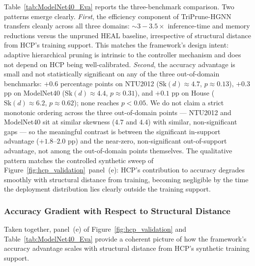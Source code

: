 \documentclass[10pt]{article}
\theoremstyle{plain}
\theoremstyle{definition}
\begin{document}
Table~\ref{tab:ModelNet40_Eva} reports the three-benchmark comparison. Two patterns emerge clearly. \emph{First}, the efficiency component of TriPrune-HGNN transfers cleanly across all three domains: $\sim\!3\!-\!3.5\!\times$ inference-time and memory reductions versus the unpruned HEAL baseline, irrespective of structural distance from HCP's training support. This matches the framework's design intent: adaptive hierarchical pruning is intrinsic to the controller mechanism and does not depend on HCP being well-calibrated. \emph{Second}, the accuracy advantage is small and not statistically significant on any of the three out-of-domain benchmarks: $+0.6$ percentage points on NTU2012 ($\mathrm{Sk}(d)\!\approx\!4.7$, $p\!\approx\!0.13$), $+0.3$ pp on ModelNet40 ($\mathrm{Sk}(d)\!\approx\!4.4$, $p\!\approx\!0.31$), and $+0.1$ pp on House ($\mathrm{Sk}(d)\!\approx\!6.2$, $p\!\approx\!0.62$); none reaches $p\!<\!0.05$. We do not claim a strict monotonic ordering across the three out-of-domain points --- NTU2012 and ModelNet40 sit at similar skewness ($4.7$ and $4.4$) with similar, non-significant gaps --- so the meaningful contrast is between the significant in-support advantage ($+1.8$--$2.0$ pp) and the near-zero, non-significant out-of-support advantage, not among the out-of-domain points themselves. The qualitative pattern matches the controlled synthetic sweep of Figure~\ref{fig:hcp_validation}~panel~(e): HCP's contribution to accuracy degrades smoothly with structural distance from training, becoming negligible by the time the deployment distribution lies clearly outside the training support.

\subsubsection{Accuracy Gradient with Respect to Structural Distance}
\label{sec:Eva_gradient}

Taken together, panel~(e) of Figure~\ref{fig:hcp_validation} and Table~\ref{tab:ModelNet40_Eva} provide a coherent picture of how the framework's accuracy advantage scales with structural distance from HCP's synthetic training support.
\end{document}
